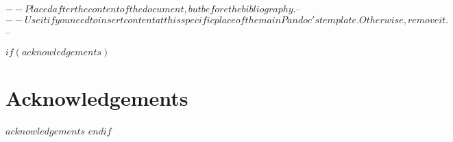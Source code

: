 $-- Placed after the content of the document, but before the bibliography. 
$-- %
$-- Use it if you need to insert content at this specific place of the main Pandoc's template. Otherwise, remove it.
$-- %

$if(acknowledgements)$
\section*{Acknowledgements}
$acknowledgements$
$endif$